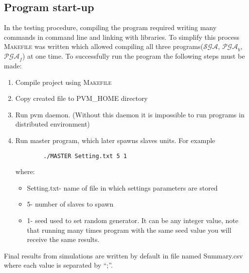 \subsection{Program start-up}
In the testing procedure, compiling the program required writing many commands in
command line and linking with libraries. To simplify this process
\textsc{Makefile} was written which allowed compiling all three
programs($\mathcal{SGA}$, $\mathcal{PGA}_b$, $\mathcal{PGA}_f$) at one time. To
successfully run the program the following steps must be made:
\begin{enumerate}
	\item Compile project using \textsc{Makefile}
	\item Copy created file to PVM\_HOME directory
	\item Run pvm daemon. (Without this daemon it is impossible to run programs
		in distributed environment)
	\item Run master program, which later spawns slaves units. For example
		\begin{verbatim}
		./MASTER Setting.txt 5 1
		\end{verbatim}
		where:
		\begin{itemize}
			\item Setting.txt- name of file in which settings parameters are
				stored
			\item 5- number of slaves to spawn
			\item 1- seed used to set random generator. It can be any integer
				value, note that running many times program with the same seed
				value you will receive the same results.
		\end{itemize}
\end{enumerate}
Final results from simulations are written by default in file named Summary.csv
where each value is separated by ``;''.
